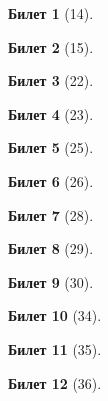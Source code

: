 \documentclass[a4paper,12pt]{article}
\newtheorem*{ticket}{Билет}
\begin{document}
	\begin{ticket}[14]
		
		\newpage
	\end{ticket}
	
	\begin{ticket}[15]
		
		\newpage
	\end{ticket}
	
	\begin{ticket}[22]
		
		\newpage
	\end{ticket}
	\begin{ticket}[23]
		
		\newpage
	\end{ticket}
	
	\begin{ticket}[25]
		
		\newpage
	\end{ticket}

	\begin{ticket}[26]
		
		\newpage
	\end{ticket}
	
	\begin{ticket}[28]
		
		\newpage
	\end{ticket}
	
	\begin{ticket}[29]
		
		\newpage
	\end{ticket}
	
	\begin{ticket}[30]
		
		\newpage
	\end{ticket}
	
	\begin{ticket}[34]
		
		\newpage
	\end{ticket}
	
	\begin{ticket}[35]
		
		\newpage
	\end{ticket}
	
	\begin{ticket}[36]
		
		\newpage
	\end{ticket}

	
	
\end{document}
